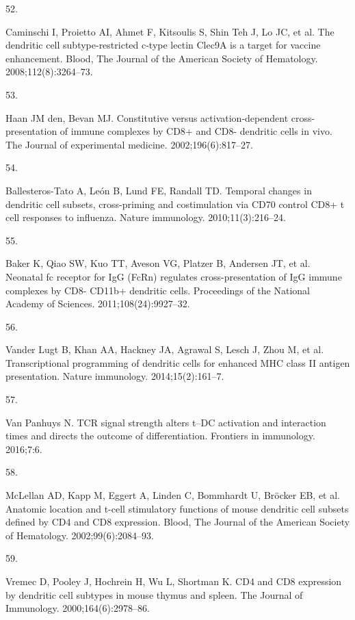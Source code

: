 \documentclass[
]{article}
\newlength{\cslhangindent}
\newlength{\csllabelwidth}
\newenvironment{CSLReferences}[2] %
 {\begin{list}{}{%
  \setlength{\itemindent}{0pt}
  \setlength{\leftmargin}{0pt}
  \setlength{\parsep}{0pt}
  \ifodd #1
   \setlength{\leftmargin}{\cslhangindent}
   \setlength{\itemindent}{-1\cslhangindent}
  \fi
  \setlength{\itemsep}{#2\baselineskip}}}
 {\end{list}}
\newcommand{\CSLLeftMargin}[1]{\parbox[t]{\csllabelwidth}{\strut#1\strut}}
\newcommand{\CSLRightInline}[1]{\parbox[t]{\linewidth - \csllabelwidth}{\strut#1\strut}}
\begin{document}
\begin{CSLReferences}{0}{1}
\CSLLeftMargin{52. }%
\CSLRightInline{Caminschi I, Proietto AI, Ahmet F, Kitsoulis S, Shin Teh
J, Lo JC, et al. The dendritic cell subtype-restricted c-type lectin
Clec9A is a target for vaccine enhancement. Blood, The Journal of the
American Society of Hematology. 2008;112(8):3264--73. }

\CSLLeftMargin{53. }%
\CSLRightInline{Haan JM den, Bevan MJ. Constitutive versus
activation-dependent cross-presentation of immune complexes by CD8+ and
CD8- dendritic cells in vivo. The Journal of experimental medicine.
2002;196(6):817--27. }

\CSLLeftMargin{54. }%
\CSLRightInline{Ballesteros-Tato A, León B, Lund FE, Randall TD.
Temporal changes in dendritic cell subsets, cross-priming and
costimulation via CD70 control CD8+ t cell responses to influenza.
Nature immunology. 2010;11(3):216--24. }

\CSLLeftMargin{55. }%
\CSLRightInline{Baker K, Qiao SW, Kuo TT, Aveson VG, Platzer B, Andersen
JT, et al. Neonatal fc receptor for IgG (FcRn) regulates
cross-presentation of IgG immune complexes by CD8- CD11b+ dendritic
cells. Proceedings of the National Academy of Sciences.
2011;108(24):9927--32. }

\CSLLeftMargin{56. }%
\CSLRightInline{Vander Lugt B, Khan AA, Hackney JA, Agrawal S, Lesch J,
Zhou M, et al. Transcriptional programming of dendritic cells for
enhanced MHC class II antigen presentation. Nature immunology.
2014;15(2):161--7. }

\CSLLeftMargin{57. }%
\CSLRightInline{Van Panhuys N. TCR signal strength alters t--DC
activation and interaction times and directs the outcome of
differentiation. Frontiers in immunology. 2016;7:6. }

\CSLLeftMargin{58. }%
\CSLRightInline{McLellan AD, Kapp M, Eggert A, Linden C, Bommhardt U,
Bröcker EB, et al. Anatomic location and t-cell stimulatory functions of
mouse dendritic cell subsets defined by CD4 and CD8 expression. Blood,
The Journal of the American Society of Hematology. 2002;99(6):2084--93.
}

\CSLLeftMargin{59. }%
\CSLRightInline{Vremec D, Pooley J, Hochrein H, Wu L, Shortman K. CD4
and CD8 expression by dendritic cell subtypes in mouse thymus and
spleen. The Journal of Immunology. 2000;164(6):2978--86. }


\end{CSLReferences}
\end{document}
